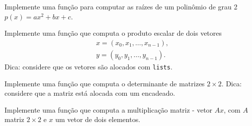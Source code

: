 \begin{exr}
  Implemente uma função para computar as raízes de um polinômio de grau 2 $p(x) = ax^2 + bx + c$.
\end{exr}

\begin{exr}
  Implemente uma função que computa o produto escalar de dois vetores
  \begin{align}
    &x = (x_0, x_1, \ldots, x_{n-1}),\\
    &y = (y_0, y_1, \ldots, y_{n-1}).
  \end{align}
  Dica: considere que os vetores são alocados com \texttt{lists}.
\end{exr}

\begin{exr}
  Implemente uma função que computa o determinante de matrizes $2\times 2$. Dica: considere que a matriz está alocada com um {\PYTHONlist} encadeado.
\end{exr}

\begin{exr}
  Implemente uma função que computa a multiplicação matriz - vetor $Ax$, com $A$ matriz $2\times 2$ e $x$ um vetor de dois elementos.
\end{exr}
